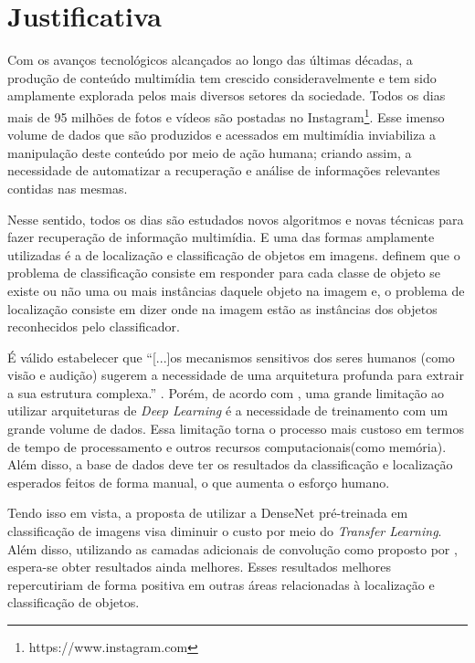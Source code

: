 \section{Justificativa}
\label{secao:1:3}

Com os avanços tecnológicos alcançados ao longo das últimas décadas, a produção de conteúdo multimídia tem crescido consideravelmente e tem sido amplamente explorada pelos mais diversos setores da sociedade. Todos os dias mais de 95 milhões de fotos e vídeos são postadas no Instagram\footnote{https://www.instagram.com}. Esse imenso volume de dados que são produzidos e acessados em multimídia inviabiliza a manipulação deste conteúdo por meio de ação humana; criando assim, a necessidade de automatizar a recuperação e análise de informações relevantes contidas nas mesmas.

Nesse sentido, todos os dias são estudados novos algoritmos e novas técnicas para fazer recuperação de informação multimídia. E uma das formas amplamente utilizadas é a de localização e classificação de objetos em imagens.  definem que o problema de classificação consiste em responder para cada classe de objeto se existe ou não uma ou mais instâncias daquele objeto na imagem e, o problema de localização consiste em dizer onde na imagem estão as instâncias dos objetos reconhecidos pelo classificador.

É válido estabelecer que ``[...]os mecanismos sensitivos dos seres humanos (como visão e audição) sugerem a necessidade de uma arquitetura profunda para extrair a sua estrutura complexa.'' \cite{deng-2014}. Porém, de acordo com , uma grande limitação ao utilizar arquiteturas de \textit{Deep Learning} é a necessidade de treinamento com um grande volume de dados. Essa limitação torna o processo mais custoso em termos de tempo de processamento e outros recursos computacionais(como memória). Além disso, a base de dados deve ter os resultados da classificação e localização esperados feitos de forma manual, o que aumenta o esforço humano.

Tendo isso em vista, a proposta de utilizar a \ac{DenseNet} \cite{liu-2017} pré-treinada em classificação de imagens visa diminuir o custo por meio do \textit{Transfer Learning}. Além disso, utilizando as camadas adicionais de convolução como proposto por , espera-se obter resultados ainda melhores. Esses resultados melhores repercutiriam de forma positiva em outras áreas relacionadas à localização e classificação de objetos. 

